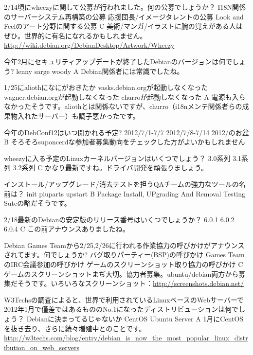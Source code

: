 %

\santaku
{2/14頃にwheezyに関して公募が行われました。何の公募でしょうか？}
{I18N関係のサーバーシステム再構築の公募}
{応援団長/イメージタレントの公募}
{Look and Feelのアート分野に関する公募}
{C}
{美術/マンガ/イラストに腕の覚えがある人はぜひ。世界的に有名になれるかもしれません。\url{http://wiki.debian.org/DebianDesktop/Artwork/Wheezy}}

\santaku
{今年2月にセキュリティアップデートが終了したDebianのバージョンは何でしょう?}
{lenny}
{sarge}
{woody}
{A}
{Debian関係者には常識でしたね。}

\santaku
{1/25にaliothになにがおきたか}
{vasks.debian.orgが起動しなくなった}
{wagner.debian.orgが起動しなくなった}
{churroが起動しなくなった}
{A}
{電源も入らなかったそうです。aliothとは関係ないですが、churro（i18nメンテ関係者らの成果物入れたサーバー）も調子悪かったです。}

\santaku
{今年のDebConf12はいつ開かれる予定?}
{2012/7/1-7/7}
{2012/7/8-7/14}
{2012/のお盆}
{B}
{そろそろsuponcerdな参加者募集動向をチェックした方がよいかもしれません}

\santaku
{wheezyに入る予定のLinuxカーネルバージョンはいくつでしょう？}
{3.0系列}
{3.1系列}
{3.2系列}
{C}
{かなり最新ですね。ドライバ開発を頑張りましょう。}

\santaku
{インストール/アップグレード/消去テストを担うQAチームの強力なツールの名前は？}
{init}
{piuparts}
{upstart}
{B}
{Package Install, UPgrading And Removal Testing Suteの略だそうです。}

\santaku
{2/18最新のDebianの安定版のリリース番号はいくつでしょうか？}
{6.0.1}
{6.0.2}
{6.0.4}
{C}
{この前アナウンスありましたね。}

\santaku
{Debian Games Teamから2/25,2/26に行われる作業協力の呼びかけがアナウンスされてます。何でしょうか?}
{バグ取りパーティー(BSP)の呼びかけ}
{Games TeamのIRC会議参加の呼びかけ}
{ゲームのスクリーンショット取り協力の呼びかけ}
{C}
{ゲームのスクリーンショットまぢ大切。協力者募集。ubuntu/debian両方から募集だそうです。いろいろなスクリーンショット：\url{http://screenshots.debian.net/}}

\santaku
{W3Techsの調査によると、世界で利用されているLinuxベースのWebサーバーで2012年1月で僅差ではあるもののNo.1になったディストリビューションは何でしょう？}
{Debianに決まってるじゃないか}
{CentOS}
{Ubuntu Server}
{A}
{1月にCentOSを抜き去り、さらに続々増殖中とのことです。\url{http://w3techs.com/blog/entry/debian_is_now_the_most_popular_linux_distribution_on_web_servers}}

